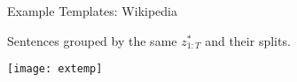 \begin{frame}{Example Templates: Wikipedia}

  Sentences grouped by the same $z_{1:T}^*$ and their splits.

  \begin{center}
    \texttt{[image: extemp]}
  \end{center}
\end{frame}














